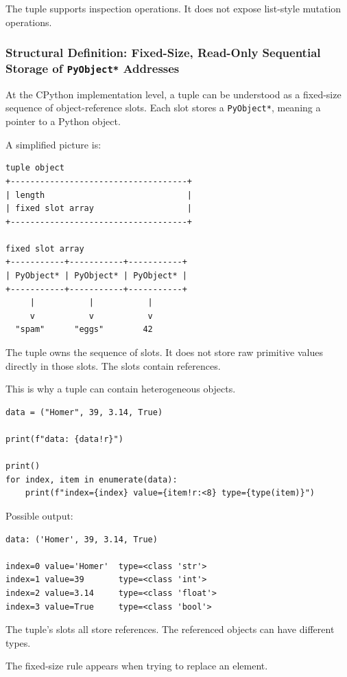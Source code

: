 The tuple supports inspection operations. It does not expose list-style mutation operations.

\subsubsection{Structural Definition: Fixed-Size, Read-Only Sequential Storage of \texttt{PyObject*} Addresses}

At the CPython implementation level, a tuple can be understood as a fixed-size sequence of object-reference slots. Each slot stores a \texttt{PyObject*}, meaning a pointer to a Python object.

A simplified picture is:

\begin{verbatim}
tuple object
+------------------------------------+
| length                             |
| fixed slot array                   |
+------------------------------------+

fixed slot array
+-----------+-----------+-----------+
| PyObject* | PyObject* | PyObject* |
+-----------+-----------+-----------+
     |           |           |
     v           v           v
  "spam"      "eggs"        42
\end{verbatim}

The tuple owns the sequence of slots. It does not store raw primitive values directly in those slots. The slots contain references.

This is why a tuple can contain heterogeneous objects.

\begin{verbatim}
data = ("Homer", 39, 3.14, True)

print(f"data: {data!r}")

print()
for index, item in enumerate(data):
    print(f"index={index} value={item!r:<8} type={type(item)}")
\end{verbatim}

Possible output:

\begin{verbatim}
data: ('Homer', 39, 3.14, True)

index=0 value='Homer'  type=<class 'str'>
index=1 value=39       type=<class 'int'>
index=2 value=3.14     type=<class 'float'>
index=3 value=True     type=<class 'bool'>
\end{verbatim}

The tuple's slots all store references. The referenced objects can have different types.

The fixed-size rule appears when trying to replace an element.

